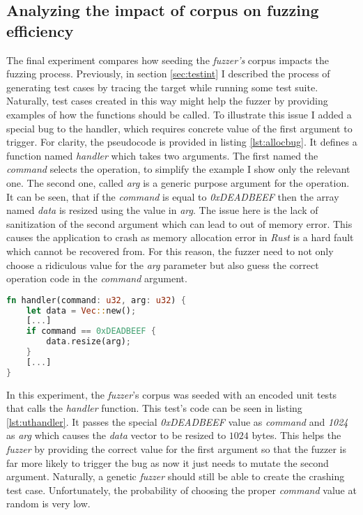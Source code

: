 \subsection{Analyzing the impact of corpus on fuzzing efficiency}
The final experiment compares how seeding the \textit{fuzzer's} corpus impacts the fuzzing process. Previously, in section \ref{sec:testint} I described the process of generating test cases by tracing the target while running some test suite. Naturally, test cases created in this way might help the fuzzer by providing examples of how the functions should be called. To illustrate this issue I added a special bug to the handler, which requires concrete value of the first argument to trigger. For clarity, the pseudocode is provided in listing \ref{lst:allocbug}. It defines a function named \textit{handler} which takes two arguments. The first named the \textit{command} selects the operation, to simplify the example I show only the relevant one. The second one, called \textit{arg} is a generic purpose argument for the operation. It can be seen, that if the \textit{command} is equal to \textit{0xDEADBEEF} then the array named \textit{data} is resized using the value in \textit{arg}. The issue here is the lack of sanitization of the second argument which can lead to out of memory error. This causes the application to crash as memory allocation error in \textit{Rust} is a hard fault which cannot be recovered from. For this reason, the fuzzer need to not only choose a ridiculous value for the \textit{arg} parameter but also guess the correct operation code in the \textit{command} argument.  

\begin{minipage}{\linewidth}
    \begin{lstlisting}[language=rust,caption={The allocation bug pseudocode.},label={lst:allocbug}]
fn handler(command: u32, arg: u32) {
    let data = Vec::new();
    [...]
    if command == 0xDEADBEEF {
        data.resize(arg);
    }
    [...]
}
    \end{lstlisting}
\end{minipage}

In this experiment, the \textit{fuzzer}'s corpus was seeded with an encoded unit tests that calls the \textit{handler} function. This test's code can be seen in listing \ref{lst:uthandler}. It passes the special \textit{0xDEADBEEF} value as \textit{command} and \textit{1024} as \textit{arg} which causes the \textit{data} vector to be resized to $1024$ bytes. This helps the \textit{fuzzer} by providing the correct value for the first argument so that the fuzzer is far more likely to trigger the bug as now it just needs to mutate the second argument. Naturally, a genetic \textit{fuzzer} should still be able to create the crashing test case. Unfortunately, the probability of choosing the proper \textit{command} value at random is very low. 

